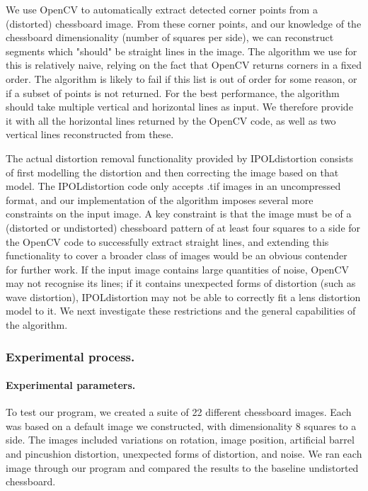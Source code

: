 We use OpenCV to automatically extract detected corner points from a (distorted) chessboard image. From these corner points, and our knowledge of the chessboard dimensionality (number of squares per side), we can reconstruct segments which "should" be straight lines in the image. The algorithm we use for this is relatively naive, relying on the fact that OpenCV returns corners in a fixed order. The algorithm is likely to fail if this list is out of order for some reason, or if a subset of points is not returned. For the best performance, the algorithm should take multiple vertical and horizontal lines as input. We therefore provide it with all the horizontal lines returned by the OpenCV code, as well as two vertical lines reconstructed from these.

The actual distortion removal functionality provided by IPOLdistortion consists of first modelling the distortion and then correcting the image based on that model. The IPOLdistortion code only accepts .tif images in an uncompressed format, and our implementation of the algorithm imposes several more constraints on the input image. A key constraint is that the image must be of a (distorted or undistorted) chessboard pattern of at least four squares to a side for the OpenCV code to successfully extract straight lines, and extending this functionality to cover a broader class of images would be an obvious contender for further work. If the input image contains large quantities of noise, OpenCV may not recognise its lines; if it contains unexpected forms of distortion (such as wave distortion), IPOLdistortion may not be able to correctly fit a lens distortion model to it. We next investigate these restrictions and the general capabilities of the algorithm.

\subsubsection{Experimental process.}

\paragraph{Experimental parameters.}
To test our program, we created a suite of 22 different chessboard images. Each was based on a default image we constructed, with dimensionality 8 squares to a side. The images included variations on rotation, image position, artificial barrel and pincushion distortion, unexpected forms of distortion, and noise. We ran each image through our program and compared the results to the baseline undistorted chessboard.

